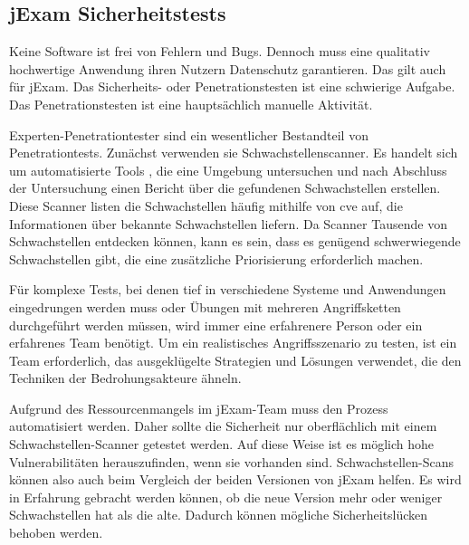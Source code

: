 \subsection{jExam Sicherheitstests}\label{ch:sicherheit}

Keine Software ist frei von Fehlern und Bugs. Dennoch muss eine qualitativ
hochwertige Anwendung ihren Nutzern Datenschutz garantieren. Das gilt
auch f\"ur jExam. Das Sicherheits- oder Penetrationstesten  ist eine schwierige
Aufgabe. Das Penetrationstesten ist eine haupts\"achlich manuelle Aktivit\"at.

Experten-Penetrationtester sind ein wesentlicher Bestandteil
von Penetrationtests. Zunächst verwenden sie Schwachstellenscanner.
Es handelt sich um automatisierte Tools , die eine Umgebung untersuchen
und nach Abschluss der Untersuchung einen Bericht über die
gefundenen Schwachstellen erstellen. Diese Scanner listen die
Schwachstellen häufig mithilfe von \gls{cve} auf, die Informationen
über bekannte Schwachstellen liefern. Da Scanner Tausende von
Schwachstellen entdecken können, kann es sein, dass es
genügend schwerwiegende Schwachstellen gibt, die eine zusätzliche
Priorisierung erforderlich machen.


Für komplexe Tests, bei denen tief in verschiedene Systeme und
Anwendungen eingedrungen werden muss oder \"Ubungen mit mehreren
Angriffsketten durchgeführt werden m\"ussen, wird immer eine
erfahrenere Person oder ein erfahrenes Team benötigt. Um ein
realistisches Angriffsszenario zu testen, ist ein Team erforderlich,
das ausgekl\"ugelte Strategien und Lösungen verwendet, die den
Techniken der Bedrohungsakteure ähneln.


Aufgrund des Ressourcenmangels im jExam-Team muss den Prozess
automatisiert werden.  Daher sollte die Sicherheit nur
oberflächlich mit einem Schwachstellen-Scanner getestet werden.
Auf diese Weise ist es m\"oglich hohe Vulnerabilit\"aten
herauszufinden, wenn sie vorhanden sind. Schwachstellen-Scans
k\"onnen also auch beim Vergleich der beiden Versionen von jExam
helfen. Es wird in Erfahrung gebracht werden k\"onnen, ob die neue Version mehr oder weniger
Schwachstellen hat als die alte. Dadurch k\"onnen m\"ogliche
Sicherheitsl\"ucken behoben werden.